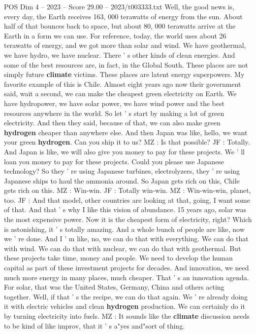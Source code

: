\begin{textsample}{POS Dim 4 – 2023 – Score 29.00 – 2023/t003333.txt}
Well, the good news is, every day, the Earth receives 163, 000 terawatts of energy from the sun.
About half of that bounces back to space, but about 80, 000 terawatts arrive at the Earth in a form we can use.
For reference, today, the world uses about 26 terawatts of energy, and we got more than solar and wind.
We have geothermal, we have hydro, we have nuclear.
There ' s other kinds of clean energies.
And some of the best resources are, in fact, in the Global South.
These places are not simply future \textbf{climate} victims.
These places are latent energy superpowers.
My favorite example of this is Chile.
Almost eight years ago now their government said, wait a second, we can make the cheapest green electricity on Earth.
We have hydropower, we have solar power, we have wind power and the best resources anywhere in the world.
So let ' s start by making a lot of green electricity.
And then they said, because of that, we can also make green \textbf{hydrogen} cheaper than anywhere else.
And then Japan was like, hello, we want your green \textbf{hydrogen}.
Can you ship it to us?
MZ : Is that possible?
JF : Totally.
And Japan is like, we will also give you money to pay for these projects.
We ' ll loan you money to pay for these projects.
Could you please use Japanese technology?
So they ' re using Japanese turbines, electrolyzers, they ' re using Japanese ships to haul the ammonia around.
So Japan gets rich on this, Chile gets rich on this.
MZ : Win-win.
JF : Totally win-win.
MZ : Win-win-win, planet, too.
JF : And that model, other countries are looking at that, going, I want some of that.
And that ' s why I like this vision of abundance. 15 years ago, solar was the most expensive power.
Now it is the cheapest form of electricity, right?
Which is astonishing, it ' s totally amazing.
And a whole bunch of people are like, now we ' re done.
And I ' m like, no, we can do that with everything.
We can do that with wind.
We can do that with nuclear, we can do that with geothermal.
But these projects take time, money and people.
We need to develop the human capital as part of these investment projects for decades.
And innovation, we need much more energy in many places, much cheaper.
That ' s an innovation agenda.
For solar, that was the United States, Germany, China and others acting together.
Well, if that ' s the recipe, we can do that again.
We ' re already doing it with electric vehicles and clean \textbf{hydrogen} production.
We can certainly do it by turning electricity into fuels.
MZ : It sounds like the \textbf{climate} discussion needs to be kind of like improv, that it ' s a"yes and"sort of thing.

\end{textsample}
